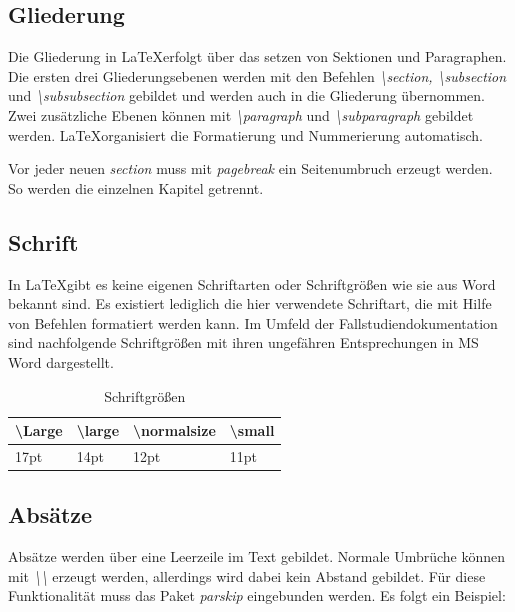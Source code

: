 \documentclass[12pt,a4paper, listof=entryprefix, bibliography=totocnumbered,toc=listofnumbered,lof=listofnumbered]{scrartcl}
\begin{document}
\subsection{Gliederung}
\label{ch:Gliederung}
Die Gliederung in \LaTeX erfolgt über das setzen von Sektionen und Paragraphen. Die ersten drei Gliederungsebenen werden mit den Befehlen \textit{\textbackslash section, \textbackslash subsection} und \textit{\textbackslash subsubsection} gebildet und werden auch in die Gliederung übernommen. Zwei zusätzliche Ebenen können mit \textit{\textbackslash paragraph} und \textit{\textbackslash subparagraph} gebildet werden. \LaTeX organisiert die Formatierung und Nummerierung automatisch.

Vor jeder neuen \textit{section} muss mit \textit{pagebreak} ein Seitenumbruch erzeugt werden. So werden die einzelnen Kapitel getrennt.

\subsection{Schrift}
\label{ch:schrift}
In \LaTeX gibt es keine eigenen Schriftarten oder Schriftgrößen wie sie aus Word bekannt sind. Es existiert lediglich die hier verwendete Schriftart, die mit Hilfe von Befehlen formatiert werden kann. Im Umfeld der Fallstudiendokumentation sind nachfolgende Schriftgrößen mit ihren ungefähren Entsprechungen in MS Word dargestellt. 

\begin{table}[H]
	\centering
	\begin{tabular}{|l|l|l|l|}
	\hline  \textbackslash Large& \textbackslash large & \textbackslash normalsize & \textbackslash small \\ 
	\hline  17pt & 14pt & 12pt & 11pt   \\ 
	\hline 
	\end{tabular} 
	\caption{Schriftgrößen} %
	\label{tab:schriftgroessen}
	
\end{table}

\subsection{Absätze}
\label{ch:absaetze}
Absätze werden über eine Leerzeile im Text gebildet. Normale Umbrüche können mit \textit{\textbackslash\textbackslash} erzeugt werden, allerdings wird dabei kein Abstand gebildet. Für diese Funktionalität muss das Paket \textit{parskip} eingebunden werden. Es folgt ein Beispiel:
\end{document}
